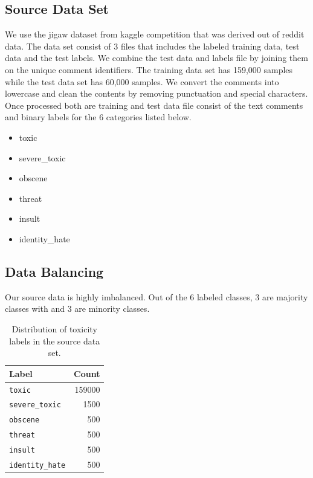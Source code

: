 \documentclass[11pt,a4paper]{article}
\begin{document}
\subsection{Source Data Set}
We use the jigaw dataset from kaggle competition that was derived out of reddit data. The data set consist of 3 files that includes the labeled training data, test data and the test labels. We combine the test data and labels file by joining them on the unique comment identifiers. The training data set has 159,000 samples while the test data set has 60,000 samples. We convert the comments into lowercase and clean the contents by removing punctuation and special characters. Once processed both are training and test data file  consist of the text comments and binary labels for the 6 categories listed below.

\begin{itemize}
\item toxic
\item severe\_toxic
\item obscene
\item threat
\item insult
\item identity\_hate
\end{itemize}

\subsection{Data Balancing}
Our source data is highly imbalanced. Out of the 6 labeled classes, 3 are majority classes with and 3 are minority classes.
\begin{table}
\centering
\begin{tabular}{l r}
\hline
\textbf{Label} & \textbf{Count}\\
\hline
\verb|toxic| & 159000 \\
\verb|severe_toxic| & 1500 \\
\verb|obscene| & 500 \\ 
\verb|threat| & 500 \\ 
\verb|insult| & 500 \\
\verb|identity_hate| & 500 \\
\hline 
\end{tabular}
\caption{Distribution of toxicity labels in the source data set.}
\end{table}
\end{document}
